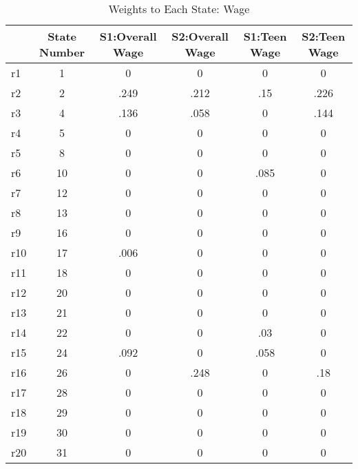 \begin{table}[htbp]\centering
\caption{Weights to Each State: Wage}
\begin{tabular}{l*{5}{c}}
\toprule
            &State Number&S1:Overall Wage&S2:Overall Wage&S1:Teen Wage&S2:Teen Wage\\
\midrule
r1          &           1&           0&           0&           0&           0\\
r2          &           2&        .249&        .212&         .15&        .226\\
r3          &           4&        .136&        .058&           0&        .144\\
r4          &           5&           0&           0&           0&           0\\
r5          &           8&           0&           0&           0&           0\\
r6          &          10&           0&           0&        .085&           0\\
r7          &          12&           0&           0&           0&           0\\
r8          &          13&           0&           0&           0&           0\\
r9          &          16&           0&           0&           0&           0\\
r10         &          17&        .006&           0&           0&           0\\
r11         &          18&           0&           0&           0&           0\\
r12         &          20&           0&           0&           0&           0\\
r13         &          21&           0&           0&           0&           0\\
r14         &          22&           0&           0&         .03&           0\\
r15         &          24&        .092&           0&        .058&           0\\
r16         &          26&           0&        .248&           0&         .18\\
r17         &          28&           0&           0&           0&           0\\
r18         &          29&           0&           0&           0&           0\\
r19         &          30&           0&           0&           0&           0\\
r20         &          31&           0&           0&           0&           0\\

\end{tabular}
\end{table}
